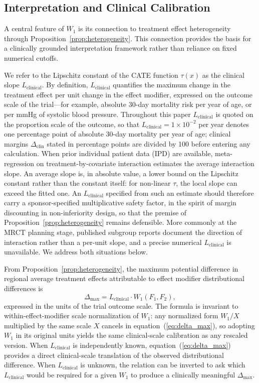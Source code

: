 \subsection{Interpretation and Clinical Calibration}\label{sec:inference}

A central feature of $W_1$ is its connection to treatment effect heterogeneity through Proposition~\ref{prop:heterogeneity}. This connection provides the basis for a clinically grounded interpretation framework rather than reliance on fixed numerical cutoffs.

We refer to the Lipschitz constant of the CATE function $\tau(x)$ as the clinical slope $L_{\text{clinical}}$. By definition, $L_{\text{clinical}}$ quantifies the maximum change in the treatment effect per unit change in the effect modifier, expressed on the outcome scale of the trial---for example, absolute 30-day mortality risk per year of age, or per mmHg of systolic blood pressure. Throughout this paper $L_{\text{clinical}}$ is quoted on the proportion scale of the outcome, so that $L_{\text{clinical}} = 1 \times 10^{-2}$ per year denotes one percentage point of absolute 30-day mortality per year of age; clinical margins $\Delta_{\text{clin}}$ stated in percentage points are divided by 100 before entering any calculation. When prior individual patient data (IPD) are available, meta-regression on treatment-by-covariate interaction estimates the average interaction slope.\cite{riley2010,fisher2017} An average slope is, in absolute value, a lower bound on the Lipschitz constant rather than the constant itself: for non-linear $\tau$, the local slope can exceed the fitted one. An $L_{\text{clinical}}$ specified from such an estimate should therefore carry a sponsor-specified multiplicative safety factor, in the spirit of margin discounting in non-inferiority design, so that the premise of Proposition~\ref{prop:heterogeneity} remains defensible. More commonly at the MRCT planning stage, published subgroup reports document the direction of interaction rather than a per-unit slope, and a precise numerical $L_{\text{clinical}}$ is unavailable. We address both situations below.

From Proposition~\ref{prop:heterogeneity}, the maximum potential difference in regional average treatment effects attributable to effect modifier distributional differences is
\begin{equation}
\Delta_{\max} = L_{\text{clinical}} \cdot W_1(F_1, F_2),
\label{eq:delta_max}
\end{equation}
expressed in the units of the trial outcome scale. The formula is invariant to within-effect-modifier scale normalization of $W_1$: any normalized form $W_1 / X$ multiplied by the same scale $X$ cancels in equation~(\ref{eq:delta_max}), so adopting $W_1$ in its original units yields the same clinical-scale calibration as any rescaled version. When $L_{\text{clinical}}$ is independently known, equation~(\ref{eq:delta_max}) provides a direct clinical-scale translation of the observed distributional difference. When $L_{\text{clinical}}$ is unknown, the relation can be inverted to ask which $L_{\text{clinical}}$ would be required for a given $W_1$ to produce a clinically meaningful $\Delta_{\max}$.

